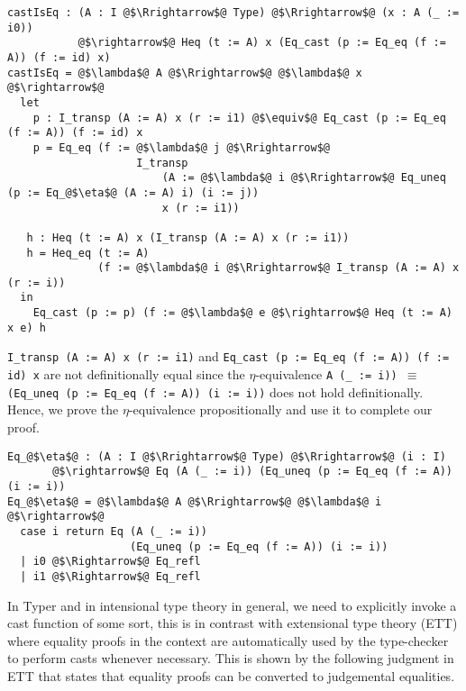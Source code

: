 \documentclass[12pt,twoside,maitrise]{dms}
\theoremstyle{definition}
\numberwithin{equation}{section}
\numberwithin{table}{chapter}
\numberwithin{figure}{chapter}
\newcommand\fn[1] {\texttt{#1}}
\begin{document}
\begin{verbatim}
castIsEq : (A : I @$\Rrightarrow$@ Type) @$\Rrightarrow$@ (x : A (_ := i0))
           @$\rightarrow$@ Heq (t := A) x (Eq_cast (p := Eq_eq (f := A)) (f := id) x)
castIsEq = @$\lambda$@ A @$\Rrightarrow$@ @$\lambda$@ x @$\rightarrow$@
  let
    p : I_transp (A := A) x (r := i1) @$\equiv$@ Eq_cast (p := Eq_eq (f := A)) (f := id) x
    p = Eq_eq (f := @$\lambda$@ j @$\Rrightarrow$@
                    I_transp
                        (A := @$\lambda$@ i @$\Rrightarrow$@ Eq_uneq (p := Eq_@$\eta$@ (A := A) i) (i := j))
                        x (r := i1))

   h : Heq (t := A) x (I_transp (A := A) x (r := i1))
   h = Heq_eq (t := A)
              (f := @$\lambda$@ i @$\Rrightarrow$@ I_transp (A := A) x (r := i))
  in
    Eq_cast (p := p) (f := @$\lambda$@ e @$\rightarrow$@ Heq (t := A) x e) h
\end{verbatim}


\fn{I_transp (A := A) x (r := i1)} and \fn{Eq_cast (p := Eq_eq (f := A)) (f :=
  id) x} are not definitionally equal since the $\eta$-equivalence \fn{A (_ :=
  i)) $\equiv$ (Eq_uneq (p := Eq_eq (f := A)) (i := i))} does not hold
definitionally. Hence, we prove the $\eta$-equivalence propositionally and use
it to complete our proof.

\begin{verbatim}
Eq_@$\eta$@ : (A : I @$\Rrightarrow$@ Type) @$\Rrightarrow$@ (i : I)
       @$\rightarrow$@ Eq (A (_ := i)) (Eq_uneq (p := Eq_eq (f := A)) (i := i))
Eq_@$\eta$@ = @$\lambda$@ A @$\Rrightarrow$@ @$\lambda$@ i @$\rightarrow$@
  case i return Eq (A (_ := i))
                   (Eq_uneq (p := Eq_eq (f := A)) (i := i))
  | i0 @$\Rightarrow$@ Eq_refl
  | i1 @$\Rightarrow$@ Eq_refl
\end{verbatim}


In Typer and in intensional type theory in general, we need to explicitly invoke
a cast function of some sort, this is in contrast with extensional type theory
(ETT)\cite{martin1982constructive} where equality proofs in the context are
automatically used by the type-checker to perform casts whenever necessary. This
is shown by the following judgment in ETT that states that equality proofs can
be converted to judgemental equalities.
\end{document}
